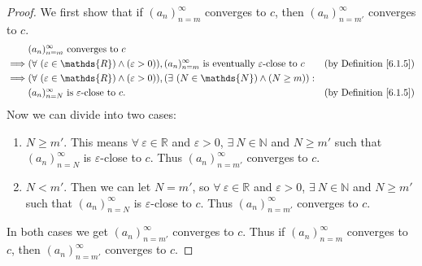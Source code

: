 \begin{proof}
We first show that if \((a_n)_{n = m}^\infty\) converges to \(c\), then \((a_n)_{n = m'}^\infty\) converges to \(c\).
\begin{align*}
& (a_n)_{n = m}^\infty \text{ converges to } c \\
\implies & (\forall\ (\varepsilon \in \mathds{R}) \land (\varepsilon > 0)), (a_n)_{n = m}^\infty \text{ is eventually } \varepsilon\text{-close to } c & \text{(by Definition \ref{6.1.5})} \\
\implies & (\forall\ (\varepsilon \in \mathds{R}) \land (\varepsilon > 0)), (\exists\ (N \in \mathds{N}) \land (N \geq m)) : \\
& (a_n)_{n = N}^\infty \text{ is } \varepsilon\text{-close to } c. & \text{(by Definition \ref{6.1.5})}
\end{align*}
Now we can divide into two cases:
\begin{enumerate}
    \item \(N \geq m'\).
    This means \(\forall\ \varepsilon \in \mathds{R}\) and \(\varepsilon > 0\), \(\exists\ N \in \mathds{N}\) and \(N \geq m'\) such that \((a_n)_{n = N}^\infty\) is \(\varepsilon\)-close to \(c\).
    Thus \((a_n)_{n = m'}^\infty\) converges to \(c\).
    \item \(N < m'\).
    Then we can let \(N = m'\), so \(\forall\ \varepsilon \in \mathds{R}\) and \(\varepsilon > 0\), \(\exists\ N \in \mathds{N}\) and \(N \geq m'\) such that \((a_n)_{n = N}^\infty\) is \(\varepsilon\)-close to \(c\).
    Thus \((a_n)_{n = m'}^\infty\) converges to \(c\).
\end{enumerate}
In both cases we get \((a_n)_{n = m'}^\infty\) converges to \(c\).
Thus if \((a_n)_{n = m}^\infty\) converges to \(c\), then \((a_n)_{n = m'}^\infty\) converges to \(c\).


\end{proof}
